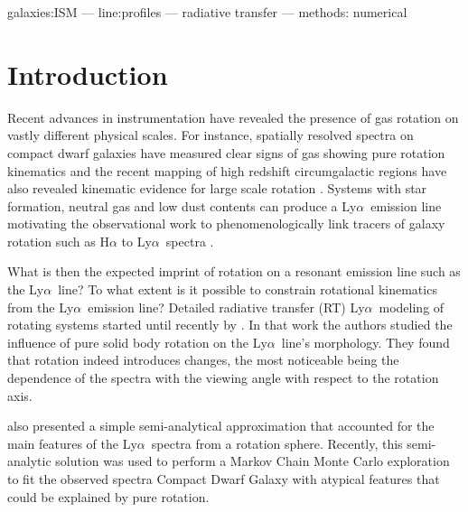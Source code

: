 \documentclass[a4paper,fleqn,usenatbib]{mnras}
\newcommand{\lya}{\ifmmode{{\rm Ly}\alpha}\else Ly$\alpha$\ \fi}
\begin{document}
\begin{keywords}
galaxies:ISM --- line:profiles --- radiative transfer --- methods: numerical
\end{keywords}




\section{Introduction}
\label{sec:intro}

Recent advances in instrumentation have revealed the presence of gas
rotation on vastly different physical scales.
For instance, spatially resolved spectra on compact dwarf galaxies
have measured clear signs of gas showing pure rotation kinematics
\citep{2015A&A...577A..21C,2017A&A...600A.125C} and the recent mapping of
high redshift circumgalactic regions have also revealed kinematic
evidence for large scale rotation \citep{2018MNRAS.473.3907A}.
Systems with star formation, neutral gas and low dust
contents can produce a \lya emission line \citep{PartridgePeebles}
motivating the observational work to phenomenologically link tracers
of galaxy rotation such as H$\alpha$ to \lya spectra
\citep[e.g.][]{Herenz2016}.  

What is then the expected imprint of rotation on a resonant emission
line such as the \lya line? To what extent is it possible to constrain
rotational kinematics from the \lya emission line? 
Detailed radiative transfer (RT) \lya modeling of rotating systems
started until recently by \cite{Garavito14}.
In that work the authors studied the influence of pure solid body
rotation on the \lya line's morphology.
They found that rotation indeed introduces changes, the most
noticeable being the dependence of the spectra with the viewing
angle with respect to the rotation axis. 

\cite{Garavito14} also presented a simple semi-analytical
approximation that accounted for the main features of the \lya spectra
from a rotation sphere.
Recently, this semi-analytic solution was used to perform a Markov
Chain Monte Carlo exploration to fit the observed spectra Compact
Dwarf Galaxy \citep{tololo} with atypical features that could be
explained by pure rotation.  
\end{document}
